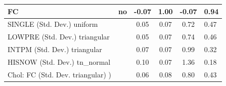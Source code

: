 \begin{table}
\begin{center}
\begin{tabular}{|l|l|c|c|c|l|}
			\hline
			FC & no & -0.07 & 1.00 & -0.07 & 0.94 \\
			\hline
			SINGLE (Std. Dev.) uniform &  & 0.05 & 0.07 & 0.72 & 0.47 \\
			\hline
			LOWPRE (Std. Dev.) triangular &  & 0.05 & 0.07 & 0.74 & 0.46 \\
			\hline
			INTPM (Std. Dev.) triangular &  & 0.07 & 0.07 & 0.99 & 0.32 \\
			\hline
			HISNOW (Std. Dev.) tn_normal &  & 0.10 & 0.07 & 1.36 & 0.18 \\
			\hline
			 Chol: FC (Std. Dev. triangular) ) &  & 0.06 & 0.08 & 0.80 & 0.43 \\
			\hline
		\end{tabular}
	\end{center}
\end{table}